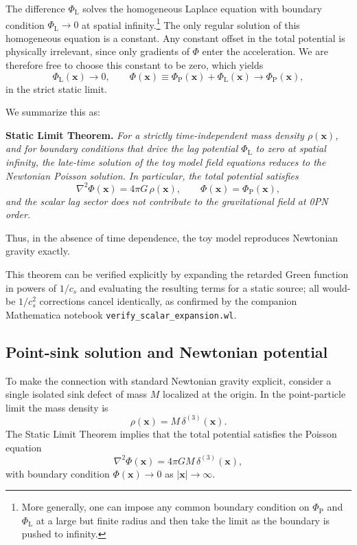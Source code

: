 \documentclass[11pt]{article}
\newcommand{\cS}{c_s}
\newcommand{\PhiP}{\Phi_{\mathrm{P}}}
\newcommand{\PhiL}{\Phi_{\mathrm{L}}}
\begin{document}
The difference $\PhiL$ solves the homogeneous Laplace equation with boundary condition $\PhiL \to 0$ at spatial infinity.\footnote{More generally, one can impose any common boundary condition on $\PhiP$ and $\PhiL$ at a large but finite radius and then take the limit as the boundary is pushed to infinity.} The only regular solution of this homogeneous equation is a constant. Any constant offset in the total potential is physically irrelevant, since only gradients of $\Phi$ enter the acceleration. We are therefore free to choose this constant to be zero, which yields
\begin{equation}
  \PhiL(\mathbf{x}) \to 0,
  \qquad
  \Phi(\mathbf{x}) \equiv \PhiP(\mathbf{x}) + \PhiL(\mathbf{x}) \to \PhiP(\mathbf{x}),
\end{equation}
in the strict static limit.

We summarize this as:

\medskip\noindent
\textbf{Static Limit Theorem.}
\emph{For a strictly time-independent mass density $\rho(\mathbf{x})$, and for boundary conditions that drive the lag potential $\PhiL$ to zero at spatial infinity, the late-time solution of the toy model field equations reduces to the Newtonian Poisson solution. In particular, the total potential satisfies}
\begin{equation}
  \nabla^2 \Phi(\mathbf{x}) = 4\pi G\,\rho(\mathbf{x}),
  \qquad
  \Phi(\mathbf{x}) = \PhiP(\mathbf{x}),
\end{equation}
\emph{and the scalar lag sector does not contribute to the gravitational field at 0PN order.}

Thus, in the absence of time dependence, the toy model reproduces Newtonian gravity exactly.

This theorem can be verified explicitly by expanding the retarded Green function in powers of $1/\cS$ and evaluating the resulting terms for a static source; all would-be $1/\cS^2$ corrections cancel identically, as confirmed by the companion Mathematica notebook \texttt{verify\_scalar\_expansion.wl}.

\subsection{Point-sink solution and Newtonian potential}
\label{sec:point_sink_static}

To make the connection with standard Newtonian gravity explicit, consider a single isolated sink defect of mass $M$ localized at the origin. In the point-particle limit the mass density is
\begin{equation}
  \rho(\mathbf{x}) = M\,\delta^{(3)}(\mathbf{x}).
\end{equation}
The Static Limit Theorem implies that the total potential satisfies the Poisson equation
\begin{equation}
  \nabla^2 \Phi(\mathbf{x}) = 4\pi G M\,\delta^{(3)}(\mathbf{x}),
\end{equation}
with boundary condition $\Phi(\mathbf{x}) \to 0$ as $|\mathbf{x}| \to \infty$.
\end{document}
